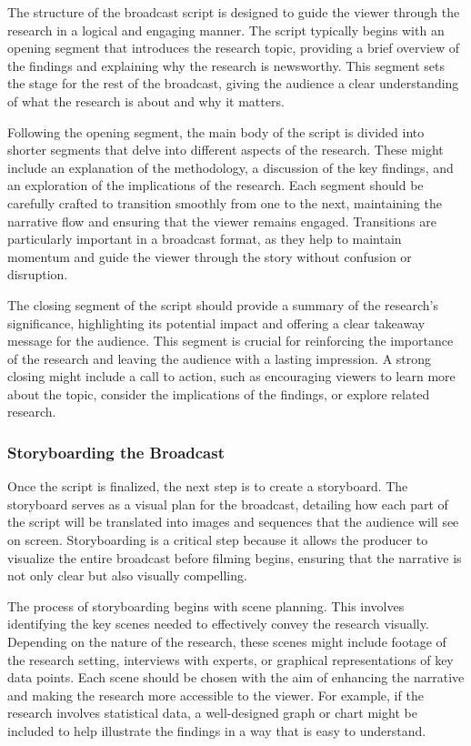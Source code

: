 \documentclass[
]{book}
\begin{document}
The structure of the broadcast script is designed to guide the viewer through the research in a logical and engaging manner. The script typically begins with an opening segment that introduces the research topic, providing a brief overview of the findings and explaining why the research is newsworthy. This segment sets the stage for the rest of the broadcast, giving the audience a clear understanding of what the research is about and why it matters.

Following the opening segment, the main body of the script is divided into shorter segments that delve into different aspects of the research. These might include an explanation of the methodology, a discussion of the key findings, and an exploration of the implications of the research. Each segment should be carefully crafted to transition smoothly from one to the next, maintaining the narrative flow and ensuring that the viewer remains engaged. Transitions are particularly important in a broadcast format, as they help to maintain momentum and guide the viewer through the story without confusion or disruption.

The closing segment of the script should provide a summary of the research's significance, highlighting its potential impact and offering a clear takeaway message for the audience. This segment is crucial for reinforcing the importance of the research and leaving the audience with a lasting impression. A strong closing might include a call to action, such as encouraging viewers to learn more about the topic, consider the implications of the findings, or explore related research.

\subsubsection*{Storyboarding the Broadcast}\label{storyboarding-the-broadcast}

Once the script is finalized, the next step is to create a storyboard. The storyboard serves as a visual plan for the broadcast, detailing how each part of the script will be translated into images and sequences that the audience will see on screen. Storyboarding is a critical step because it allows the producer to visualize the entire broadcast before filming begins, ensuring that the narrative is not only clear but also visually compelling.

The process of storyboarding begins with scene planning. This involves identifying the key scenes needed to effectively convey the research visually. Depending on the nature of the research, these scenes might include footage of the research setting, interviews with experts, or graphical representations of key data points. Each scene should be chosen with the aim of enhancing the narrative and making the research more accessible to the viewer. For example, if the research involves statistical data, a well-designed graph or chart might be included to help illustrate the findings in a way that is easy to understand.
\end{document}
